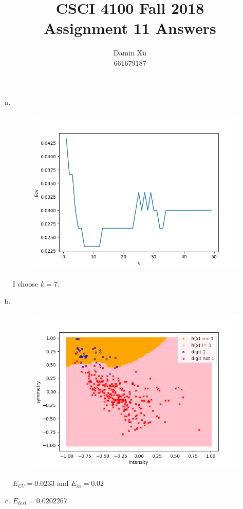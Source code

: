 \documentclass[11pt]{article}
\title{CSCI 4100 Fall 2018 \\
Assignment 11 Answers}
\author{Damin Xu\\661679187}
\begin{document}
\maketitle
\newpage
\begin{enumerate} [(a)]
	\item \ \begin{figure}[htb] 
			{\includegraphics[height=8cm]{p1a.png}}
	\end{figure}
	I choose $k = 7$.
	\item \ \begin{figure}[htb] 
			{\includegraphics[height=8cm]{p1b.png}}
	\end{figure}
	$E_{CV} = 0.0233$ and $E_{in} = 0.02$

	\item $E_{test} = 0.0202267$
\end{enumerate}
\end{document}
